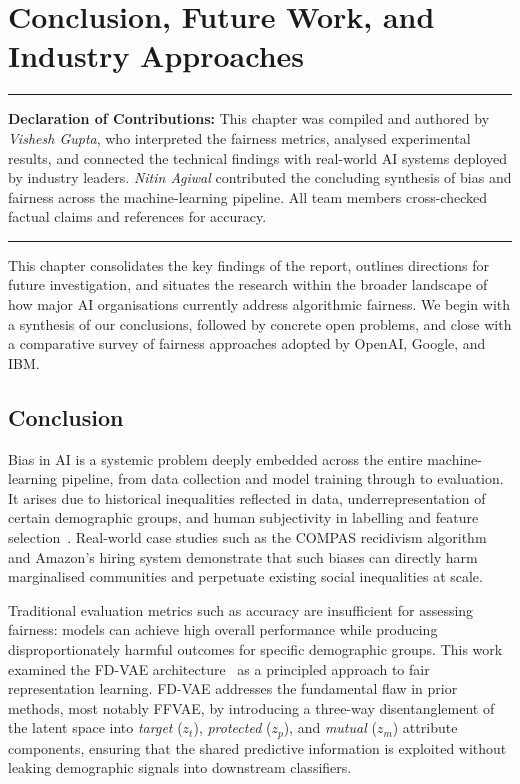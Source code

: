 \chapter{Conclusion, Future Work, and Industry Approaches}
\label{ch:conclusion}


\vspace{0.5em}
\noindent\rule{\textwidth}{0.4pt}
\noindent\textbf{Declaration of Contributions:}
This chapter was compiled and authored by \textit{Vishesh Gupta}, who
interpreted the fairness metrics, analysed experimental results, and connected
the technical findings with real-world AI systems deployed by industry leaders.
\textit{Nitin Agiwal} contributed the concluding synthesis of bias and fairness
across the machine-learning pipeline. All team members cross-checked factual claims and references for accuracy.
\noindent\rule{\textwidth}{0.4pt}
\vspace{1em}

\bigskip

This chapter consolidates the key findings of the report, outlines directions
for future investigation, and situates the research within the broader landscape
of how major AI organisations currently address algorithmic fairness.
We begin with a synthesis of our conclusions, followed by concrete open
problems, and close with a comparative survey of fairness approaches adopted by
OpenAI, Google, and IBM.

\section{Conclusion}

Bias in AI is a systemic problem deeply embedded across the entire
machine-learning pipeline, from data collection and model training through to
evaluation.
It arises due to historical inequalities reflected in data, underrepresentation
of certain demographic groups, and human subjectivity in labelling and feature
selection~\cite{propublica_compas}.
Real-world case studies such as the COMPAS recidivism algorithm and Amazon's
hiring system demonstrate that such biases can directly harm marginalised
communities and perpetuate existing social inequalities at scale.

Traditional evaluation metrics such as accuracy are insufficient for assessing
fairness: models can achieve high overall performance while producing
disproportionately harmful outcomes for specific demographic groups.
This work examined the FD-VAE architecture~\cite{park2020readme} as a
principled approach to fair representation learning.
FD-VAE addresses the fundamental flaw in prior methods, most notably
FFVAE, by introducing a three-way disentanglement of the latent space into
\emph{target} ($z_t$), \emph{protected} ($z_p$), and \emph{mutual} ($z_m$)
attribute components, ensuring that the shared predictive information is
exploited without leaking demographic signals into downstream classifiers.

